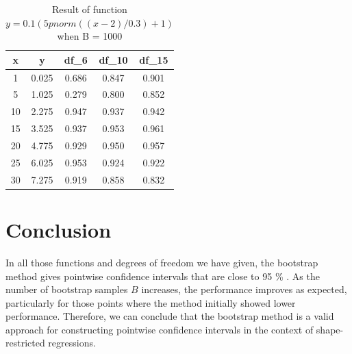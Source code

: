 \documentclass[12pt]{article}
\begin{document}
\begin{table}[ht]
  \centering
  \caption{Result of function \( y = 0.1 (5pnorm((x - 2) / 0.3) + 1)\) when B = 1000}
\begin{tabular}{|c|c|c|c|c|}
    \hline
\textbf{x} & \textbf{y} & \textbf{df\_6} & \textbf{df\_10} & \textbf{df\_15} \\
    \hline
    1 & 0.025 & 0.686 & 0.847 & 0.901 \\
    \hline
    5 & 1.025 & 0.279 & 0.800 & 0.852 \\
    \hline
    10 & 2.275 & 0.947 & 0.937 & 0.942 \\
    \hline
    15 & 3.525 & 0.937 & 0.953 & 0.961 \\
    \hline
    20 & 4.775 & 0.929 & 0.950 & 0.957 \\
    \hline
    25 & 6.025 & 0.953 & 0.924 & 0.922 \\
    \hline
    30 & 7.275 & 0.919 & 0.858 & 0.832 \\
    \hline
  \end{tabular}
\end{table}













\section{Conclusion}
\label{Conclusion}

In all those functions and degrees of freedom we have given, the bootstrap method gives pointwise confidence intervals that are close to 95 \% . As the number of bootstrap samples \(B\) increases, the performance improves as expected, particularly for those points where the method initially showed lower performance. Therefore, we can conclude that the bootstrap method is a valid approach for constructing pointwise confidence intervals in the context of shape-restricted regressions.



\end{document}

